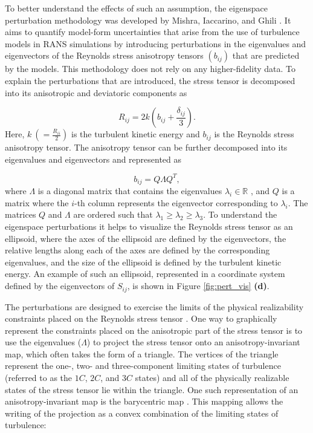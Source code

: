 To better understand the effects of such an assumption, the eigenspace perturbation methodology was developed by Mishra, Iaccarino, and Ghili \cite{iaccarino_eig_pert}. It aims to quantify model-form uncertainties that arise from the use of turbulence models in RANS simulations by introducing perturbations in the eigenvalues and eigenvectors of the Reynolds stress anisotropy tensors $\left ( b_{ij} \right )$ that are predicted by the models. This methodology does not rely on any higher-fidelity data. To explain the perturbations that are introduced, the stress tensor is decomposed into its anisotropic and deviatoric components as
 
\begin{equation}\label{equ:rst_decomp}
    R_{ij}=2k(b_{ij}+\frac{\delta_{ij}}{3}).
\end{equation}
Here, $k~(=\frac{R_{ii}}{2})$ is the turbulent kinetic energy and $b_{ij}$ is the Reynolds stress anisotropy tensor. The anisotropy tensor can be further decomposed into its eigenvalues and eigenvectors and represented as

\begin{equation}\label{equ:eigendecomposition}
b_{ij}=Q \Lambda Q^T,
\end{equation}
where $\Lambda$ is a diagonal matrix that contains the eigenvalues $\lambda_i \in \mathbb{R}$ \cite{Gerolymos2016AlgebraicPA}, and $Q$ is a matrix where the $i$-th column represents the eigenvector corresponding to $\lambda_i$. The matrices $Q$ and $\Lambda$ are ordered such that $\lambda_{1}\geq\lambda_{2}\geq\lambda_{3}$. To understand the eigenspace perturbations it helps to visualize the Reynolds stress tensor as an ellipsoid, where the axes of the ellipsoid are defined by the eigenvectors, the relative lengths along each of the axes are defined by the corresponding eigenvalues, and the size of the ellipsoid is defined by the turbulent kinetic energy. An example of such an ellipsoid, represented in a coordinate system defined by the eigenvectors of $S_{ij}$, is shown in Figure \ref{fig:pert_vis} \textbf{(d)}. 

The perturbations are designed to exercise the limits of the physical realizability constraints placed on the Reynolds stress tensor \cite{schumann1977realizability,speziale1994realizability,2014realizability}. One way to graphically represent the constraints placed on the anisotropic part of the stress tensor is to use the eigenvalues ($\Lambda$) to project the stress tensor onto an anisotropy-invariant map, which often takes the form of a triangle. The vertices of the triangle represent the one-, two- and three-component limiting states of turbulence (referred to as the $1C$, $2C$, and $3C$ states) and all of the physically realizable states of the stress tensor lie within the triangle. One such representation of an anisotropy-invariant map is the barycentric map \cite{banerjee2007presentation}. This mapping allows the writing of the projection as a convex combination of the limiting states of turbulence: 

